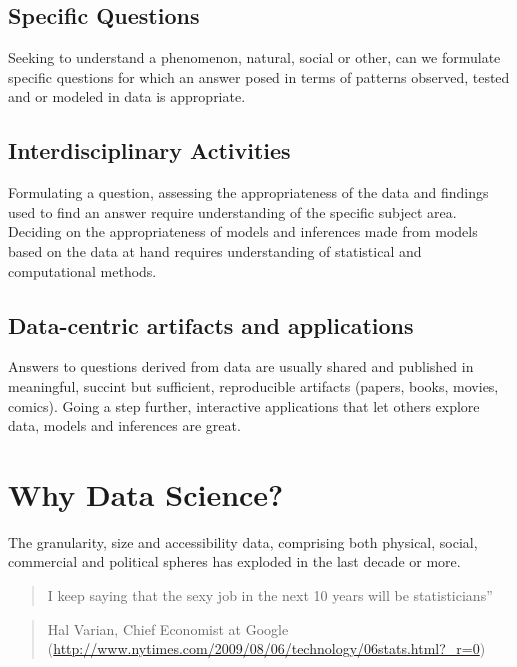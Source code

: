 \documentclass[12pt,]{book}
\theoremstyle{definition}
\theoremstyle{definition}
\theoremstyle{remark}
\begin{document}
\subsection{Specific Questions}\label{specific-questions}

Seeking to understand a phenomenon, natural, social or other, can we
formulate specific questions for which an answer posed in terms of
patterns observed, tested and or modeled in data is appropriate.

\subsection{Interdisciplinary
Activities}\label{interdisciplinary-activities}

Formulating a question, assessing the appropriateness of the data and
findings used to find an answer require understanding of the specific
subject area. Deciding on the appropriateness of models and inferences
made from models based on the data at hand requires understanding of
statistical and computational methods.

\subsection{Data-centric artifacts and
applications}\label{data-centric-artifacts-and-applications}

Answers to questions derived from data are usually shared and published
in meaningful, succint but sufficient, reproducible artifacts (papers,
books, movies, comics). Going a step further, interactive applications
that let others explore data, models and inferences are great.

\section{Why Data Science?}\label{why-data-science}

The granularity, size and accessibility data, comprising both physical,
social, commercial and political spheres has exploded in the last decade
or more.

\begin{quote}
I keep saying that the sexy job in the next 10 years will be
statisticians''
\end{quote}

\begin{quote}
Hal Varian, Chief Economist at Google
(\url{http://www.nytimes.com/2009/08/06/technology/06stats.html?_r=0})
\end{quote}
\end{document}
